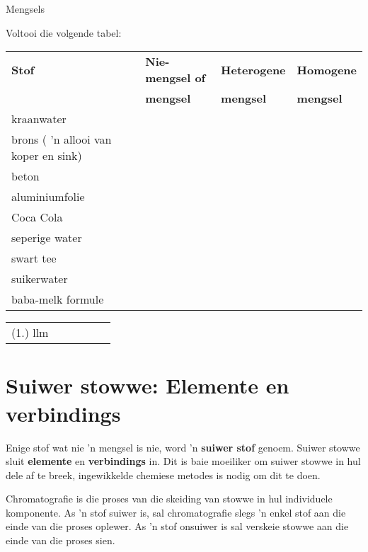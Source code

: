\begin{exercises}{Mengsels}
{Voltooi die volgende tabel: \par
\begin{tabular}{|l|l|l|l|}\hline
\textbf{Stof} & \textbf{Nie-mengsel of} & \textbf{Heterogene} & \textbf{Homogene} \\ 
 & \textbf{mengsel} & \textbf{mengsel} & \textbf{mengsel} \\ \hline
kraanwater & & & \\ \hline
brons ( 'n allooi van koper en sink) & & & \\ \hline
beton & & & \\ \hline
aluminiumfolie & & & \\ \hline
Coca Cola & & & \\ \hline
seperige water & & & \\ \hline
swart tee & & & \\ \hline
suikerwater & & & \\ \hline
baba-melk formule & & & \\ \hline
\end{tabular}

\practiceinfo
\begin{tabular}[h]{cccccc}
 (1.) llm  &
\end{tabular} 
}
\end{exercises}


\section{Suiwer stowwe: Elemente en verbindings}
\nopagebreak
Enige stof wat nie 'n mengsel is nie, word 'n \textbf{suiwer stof} genoem. Suiwer stowwe sluit \textbf{elemente} en \textbf{verbindings} in. Dit is baie moeiliker om suiwer stowwe in hul dele af te breek, ingewikkelde chemiese metodes is nodig om dit te doen.\par


Chromatografie is die proses van die skeiding van stowwe in hul individuele komponente. As 'n stof suiwer is, sal chromatografie slegs 'n enkel stof aan die einde van die proses oplewer. As 'n stof onsuiwer is sal verskeie stowwe aan die einde van die proses sien.\par

